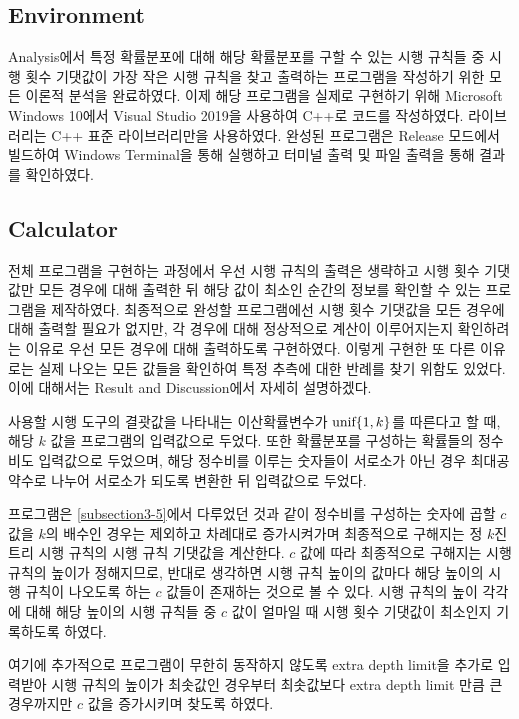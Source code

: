 \documentclass[11pt]{article}
\begin{document}
\subsection{Environment}
Analysis에서 특정 확률분포에 대해 해당 확률분포를 구할 수 있는 시행 규칙들 중 시행 횟수 기댓값이 가장 작은 시행 규칙을 찾고 출력하는 프로그램을 작성하기 위한 모든 이론적 분석을 완료하였다. 이제 해당 프로그램을 실제로 구현하기 위해 Microsoft Windows 10에서 Visual Studio 2019을 사용하여 C++로 코드를 작성하였다. 라이브러리는 C++ 표준 라이브러리만을 사용하였다. 완성된 프로그램은 Release 모드에서 빌드하여 Windows Terminal을 통해 실행하고 터미널 출력 및 파일 출력을 통해 결과를 확인하였다.

\subsection{Calculator}
전체 프로그램을 구현하는 과정에서 우선 시행 규칙의 출력은 생략하고 시행 횟수 기댓값만 모든 경우에 대해 출력한 뒤 해당 값이 최소인 순간의 정보를 확인할 수 있는 프로그램을 제작하였다. 최종적으로 완성할 프로그램에선 시행 횟수 기댓값을 모든 경우에 대해 출력할 필요가 없지만, 각 경우에 대해 정상적으로 계산이 이루어지는지 확인하려는 이유로 우선 모든 경우에 대해 출력하도록 구현하였다. 이렇게 구현한 또 다른 이유로는 실제 나오는 모든 값들을 확인하여 특정 추측에 대한 반례를 찾기 위함도 있었다. 이에 대해서는 Result and Discussion에서 자세히 설명하겠다.

사용할 시행 도구의 결괏값을 나타내는 이산확률변수가 $\textnormal{unif}\{1, k\}$를 따른다고 할 때, 해당 $k$ 값을 프로그램의 입력값으로 두었다. 또한 확률분포를 구성하는 확률들의 정수비도 입력값으로 두었으며, 해당 정수비를 이루는 숫자들이 서로소가 아닌 경우 최대공약수로 나누어 서로소가 되도록 변환한 뒤 입력값으로 두었다.

프로그램은 \ref{subsection3-5}에서 다루었던 것과 같이 정수비를 구성하는 숫자에 곱할 $c$ 값을 $k$의 배수인 경우는 제외하고 차례대로 증가시켜가며 최종적으로 구해지는 정 $k$진 트리 시행 규칙의 시행 규칙 기댓값을 계산한다. $c$ 값에 따라 최종적으로 구해지는 시행 규칙의 높이가 정해지므로, 반대로 생각하면 시행 규칙 높이의 값마다 해당 높이의 시행 규칙이 나오도록 하는 $c$ 값들이 존재하는 것으로 볼 수 있다. 시행 규칙의 높이 각각에 대해 해당 높이의 시행 규칙들 중 $c$ 값이 얼마일 때 시행 횟수 기댓값이 최소인지 기록하도록 하였다.

여기에 추가적으로 프로그램이 무한히 동작하지 않도록 extra depth limit을 추가로 입력받아 시행 규칙의 높이가 최솟값인 경우부터 최솟값보다 extra depth limit 만큼 큰 경우까지만 $c$ 값을 증가시키며 찾도록 하였다.
\end{document}

